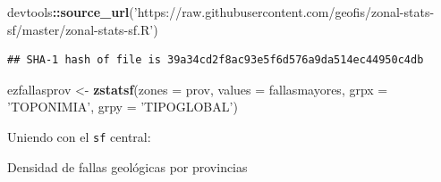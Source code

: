 \documentclass[11pt,]{article}
\newenvironment{Shaded}{\begin{snugshade}}{\end{snugshade}}
\newcommand{\KeywordTok}[1]{\textcolor[rgb]{0.13,0.29,0.53}{\textbf{#1}}}
\newcommand{\DataTypeTok}[1]{\textcolor[rgb]{0.13,0.29,0.53}{#1}}
\newcommand{\StringTok}[1]{\textcolor[rgb]{0.31,0.60,0.02}{#1}}
\newcommand{\OperatorTok}[1]{\textcolor[rgb]{0.81,0.36,0.00}{\textbf{#1}}}
\newcommand{\NormalTok}[1]{#1}
\begin{document}
\begin{Shaded}
\begin{Highlighting}[]
\NormalTok{devtools}\OperatorTok{::}\KeywordTok{source_url}\NormalTok{(}\StringTok{'https://raw.githubusercontent.com/geofis/zonal-stats-sf/master/zonal-stats-sf.R'}\NormalTok{)}
\end{Highlighting}
\end{Shaded}

\begin{verbatim}
## SHA-1 hash of file is 39a34cd2f8ac93e5f6d576a9da514ec44950c4db
\end{verbatim}

\begin{Shaded}
\begin{Highlighting}[]
\NormalTok{ezfallasprov <-}\StringTok{ }\KeywordTok{zstatsf}\NormalTok{(}\DataTypeTok{zones =}\NormalTok{ prov, }\DataTypeTok{values =}\NormalTok{ fallasmayores, }\DataTypeTok{grpx =} \StringTok{'TOPONIMIA'}\NormalTok{, }\DataTypeTok{grpy =} \StringTok{'TIPOGLOBAL'}\NormalTok{)}
\end{Highlighting}
\end{Shaded}

Uniendo con el \texttt{sf} central:

\begin{Shaded}
\end{Shaded}

Densidad de fallas geológicas por provincias

\begin{Shaded}
\end{Shaded}
\end{document}
